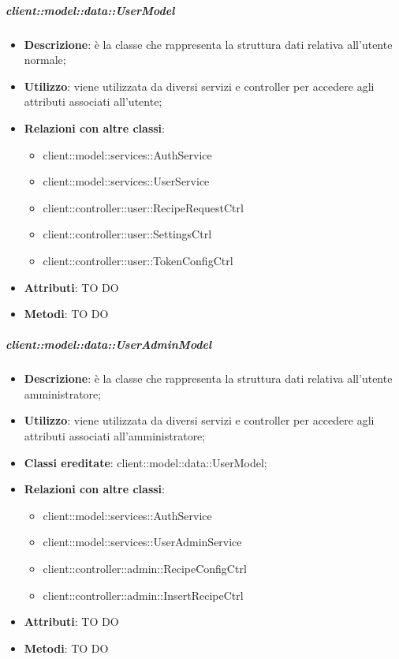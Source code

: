 		\subparagraph{client::model::data::UserModel} %
		\label{subp:client_model_data_user}
			\begin{itemize}
				\item \textbf{Descrizione}: è la classe che rappresenta la struttura dati relativa all'utente normale;
				\item \textbf{Utilizzo}: viene utilizzata da diversi servizi e controller per accedere agli attributi associati all'utente;
				\item \textbf{Relazioni con altre classi}:
					\begin{itemize}
						\item client::model::services::AuthService
						\item client::model::services::UserService
						\item client::controller::user::RecipeRequestCtrl
						\item client::controller::user::SettingsCtrl
						\item client::controller::user::TokenConfigCtrl
					\end{itemize}
				\item \textbf{Attributi}: TO DO
				\item \textbf{Metodi}: TO DO
			\end{itemize}

		\subparagraph{client::model::data::UserAdminModel} %
		\label{subp:client_model_data_useradminmodel}
			\begin{itemize}
				\item \textbf{Descrizione}: è la classe che rappresenta la struttura dati relativa all'utente amministratore;
				\item \textbf{Utilizzo}: viene utilizzata da diversi servizi e controller per accedere agli attributi associati all'amministratore;
				\item \textbf{Classi ereditate}: client::model::data::UserModel;
				\item \textbf{Relazioni con altre classi}:
					\begin{itemize}
						\item client::model::services::AuthService
						\item client::model::services::UserAdminService
						\item client::controller::admin::RecipeConfigCtrl
						\item client::controller::admin::InsertRecipeCtrl
					\end{itemize}
				\item \textbf{Attributi}: TO DO
				\item \textbf{Metodi}: TO DO
			\end{itemize}

